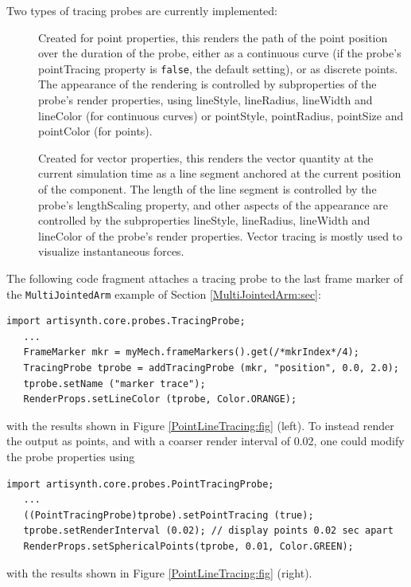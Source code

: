 Two types of tracing probes are currently implemented:

\begin{description}

\item[]\mbox{}

Created for point properties, this renders the path of the point position over
the duration of the probe, either as a continuous curve (if the probe's {\sf
pointTracing} property is {\tt false}, the default setting), or as discrete
points. The appearance of the rendering is controlled by subproperties of the
probe's render properties, using {\sf lineStyle}, {\sf lineRadius}, {\sf
lineWidth} and {\sf lineColor} (for continuous curves) or {\sf pointStyle},
{\sf pointRadius}, {\sf pointSize} and {\sf pointColor} (for points).

\item[]\mbox{}

Created for vector properties, this renders the vector quantity at the current
simulation time as a line segment anchored at the current position of the
component. The length of the line segment is controlled by the probe's {\sf
lengthScaling} property, and other aspects of the appearance are controlled by
the subproperties {\sf lineStyle}, {\sf lineRadius}, {\sf lineWidth} and {\sf
lineColor} of the probe's render properties. Vector tracing is mostly used to
visualize instantaneous forces.

\end{description}

The following code fragment attaches a tracing probe to the last frame marker
of the {\tt MultiJointedArm} example of Section \ref{MultiJointedArm:sec}:
%
\begin{lstlisting}[]
import artisynth.core.probes.TracingProbe;
   ...
   FrameMarker mkr = myMech.frameMarkers().get(/*mkrIndex*/4);
   TracingProbe tprobe = addTracingProbe (mkr, "position", 0.0, 2.0);
   tprobe.setName ("marker trace");
   RenderProps.setLineColor (tprobe, Color.ORANGE);
\end{lstlisting}
%
with the results shown in Figure \ref{PointLineTracing:fig} (left).  To instead
render the output as points, and with a coarser render interval of 0.02, one
could modify the probe properties using
%
\begin{lstlisting}[]
import artisynth.core.probes.PointTracingProbe;
   ...
   ((PointTracingProbe)tprobe).setPointTracing (true);
   tprobe.setRenderInterval (0.02); // display points 0.02 sec apart
   RenderProps.setSphericalPoints(tprobe, 0.01, Color.GREEN);
\end{lstlisting}
%
with the results shown in Figure \ref{PointLineTracing:fig} (right).

